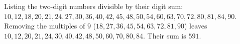 Listing the two-digit numbers divisible by their digit sum: $10,12,18,20,21,24,27,30,36,40,42,45,48,50,54,60,63,70,72,80,81,84,90$. Removing the multiples of $9$ ($18,27,36,45,54,63,72,81,90$) leaves $10,12,20,21,24,30,40,42,48,50,60,70,80,84$. Their sum is $\boxed{591}$.
